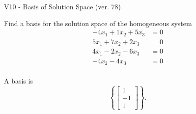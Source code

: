 \begin{exercise}
  \begin{exerciseTitle}V10 - Basis of Solution Space (ver. 78)\end{exerciseTitle}
  \begin{exerciseStatement}
    Find a basis for the solution space of the homogeneous system 
\begin{align*}
 -4 x_ 1 + 1 x_ 2 + 5 x_ 3 &= 0  \\ 
  5 x_ 1 + 7 x_ 2 + 2 x_ 3 &= 0  \\ 
  4 x_ 1 -2 x_ 2 -6 x_ 3 &= 0  \\ 
  -4 x_ 2 -4 x_ 3 &= 0  \\ 
 \end{align*}


 
  \end{exerciseStatement}

  \begin{exerciseAnswer}
   A basis is   
\[\left\{\left[\begin{array}{c}
1 \\
-1 \\
1
\end{array}\right]\right\}.\]

  


  \end{exerciseAnswer}
\end{exercise}